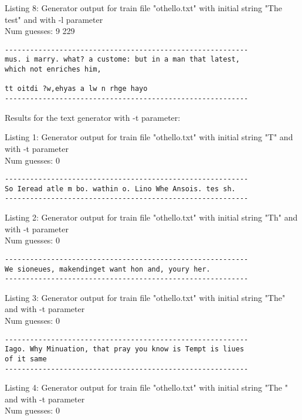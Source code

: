 \documentclass{article}
\begin{document}
Listing 8: Generator output for train file "othello.txt" with initial string "The test" and with -l parameter
\\Num guesses: 9 229

\begin{lstlisting}
----------------------------------------------------------
mus. i marry. what? a custome: but in a man that latest, 
which not enriches him,

tt oitdi ?w,ehyas a lw n rhge hayo
----------------------------------------------------------
\end{lstlisting}



Results for the text generator with -t parameter:


\hfill

Listing 1: Generator output for train file "othello.txt" with initial string "T" and with -t parameter
\\Num guesses: 0

\begin{lstlisting}
----------------------------------------------------------
So Ieread atle m bo. wathin o. Lino Whe Ansois. tes sh.
----------------------------------------------------------
\end{lstlisting}

Listing 2: Generator output for train file "othello.txt" with initial string "Th" and with -t parameter
\\Num guesses: 0

\begin{lstlisting}
----------------------------------------------------------
We sioneues, makendinget want hon and, youry her.
----------------------------------------------------------
\end{lstlisting}

Listing 3: Generator output for train file "othello.txt" with initial string "The" and with -t parameter
\\Num guesses: 0

\begin{lstlisting}
----------------------------------------------------------
Iago. Why Minuation, that pray you know is Tempt is liues 
of it same
----------------------------------------------------------
\end{lstlisting}

Listing 4: Generator output for train file "othello.txt" with initial string "The " and with -t parameter
\\Num guesses: 0
\end{document}
